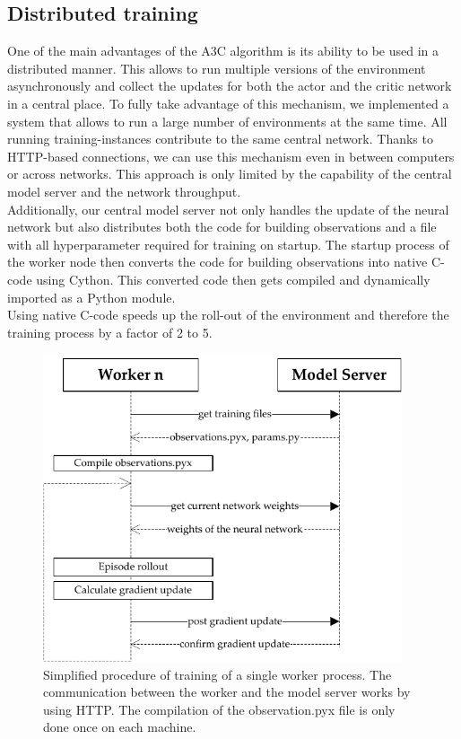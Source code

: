 \subsection*{Distributed training}
One of the main advantages of the A3C algorithm is its ability to be used in a distributed manner. This allows to run multiple versions of the environment asynchronously and collect the updates for both the actor and the critic network in a central place. To fully take advantage of this mechanism, we implemented a system that allows to run a large number of environments at the same time. All running training-instances contribute to the same central network. Thanks to HTTP-based connections, we can use this mechanism even in between computers or across networks. This approach is only limited by the capability of the central model server and the network throughput.\\
Additionally, our central model server not only handles the update of the neural network but also distributes both the code for building observations and a file with all hyperparameter required for training on startup. The startup process of the worker node then converts the code for building observations into native C-code using Cython. This converted code then gets compiled and dynamically imported as a Python module.\\
Using native C-code speeds up the roll-out of the environment and therefore the training process by a factor of 2 to 5.
\begin{figure}[H]
	\centering
	\includegraphics[width=300pt]{diagrams/distributed_training_update.pdf}
	\caption{Simplified procedure of training of a single worker process. The communication between the worker and the model server works by using HTTP. The compilation of the observation.pyx file is only done once on each machine.}
	\label{obs_descr} %
\end{figure}
